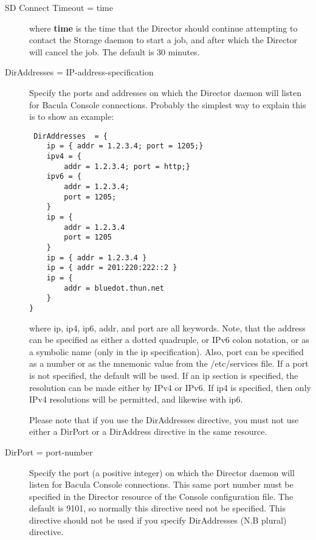 \begin{description}
\item [SD Connect Timeout = \lt{}time\gt{}]
   where {\bf time} is the time that the Director should continue
   attempting to contact the Storage daemon to start a job, and after which
   the Director will cancel the job.  The default is 30 minutes.

\item [DirAddresses = \lt{}IP-address-specification\gt{}]
   Specify the ports and addresses on which the Director daemon will listen
   for Bacula Console connections.  Probably the simplest way to explain
   this is to show an example:

\footnotesize
\begin{verbatim}
 DirAddresses  = { 
    ip = { addr = 1.2.3.4; port = 1205;}
    ipv4 = {
        addr = 1.2.3.4; port = http;}
    ipv6 = {
        addr = 1.2.3.4;
        port = 1205;
    }
    ip = {
        addr = 1.2.3.4
        port = 1205
    }
    ip = { addr = 1.2.3.4 }
    ip = { addr = 201:220:222::2 }
    ip = {
        addr = bluedot.thun.net
    }
}
\end{verbatim}
\normalsize

where ip, ip4, ip6, addr, and port are all keywords. Note, that  the address
can be specified as either a dotted quadruple, or  IPv6 colon notation, or as
a symbolic name (only in the ip specification).  Also, port can be specified
as a number or as the mnemonic value from  the /etc/services file.  If a port
is not specified, the default will be used. If an ip  section is specified,
the resolution can be made either by IPv4 or  IPv6. If ip4 is specified, then
only IPv4 resolutions will be permitted,  and likewise with ip6. 

Please note that if you use the DirAddresses directive, you must
not use either a DirPort or a DirAddress directive in the same 
resource.

\item [DirPort = \lt{}port-number\gt{}]
   Specify the port (a positive  integer) on which the  Director daemon will
   listen for Bacula Console connections.  This same port number must be
   specified in the Director resource  of the Console configuration file. The
   default is 9101, so  normally this directive need not be specified.  This
   directive should not be used if you specify DirAddresses (N.B plural)
   directive.


\end{description}
